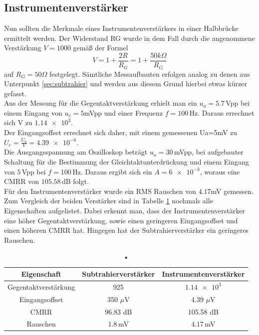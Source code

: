 \subsection{Instrumentenverstärker}
Nun sollten die Merkmale eines Instrumentenverstärkers in einer Halbbrücke ermittelt werden. Der Widerstand RG wurde in dem Fall durch die angenommene Verstärkung $V=1000$ gemäß der Formel
\begin{equation}
	V=1+\frac{2R}{R_G}=1+\frac{50k\Omega}{R_G} 
\end{equation} auf $R_G=50\Omega$ festgelegt.
Sämtliche Messaufbauten erfolgen analog zu denen aus Unterpunkt \ref{sec:subtrahier} und werden aus diesem Grund hierbei etwas kürzer gefasst. \\
Aus der Messung für die Gegentaktverstärkung erhielt man ein $u_a=5.7\,$Vpp bei einem Eingang von $u_e=5$mVpp und einer Frequenz $f=100\,$Hz. Daraus errechnet sich V zu $\num{1,14e+3}$.\\
Der Eingangsoffset errechnet sich daher, mit einem gemessenen Ua=5mV zu $U_e=\frac{U_a}{V}=\num{4.39e-6}$. \\
Die Ausgangsspannung am Oszilloskop beträgt $u_a=30\,$mVpp, bei aufgebauter Schaltung für die Bestimmung der Gleichtaktunterdrückung und einem Eingang von $5\,$Vpp bei $f=100\,$Hz. Daraus ergibt sich ein $A=\num{6e-3}$, woraus eine CMRR von $105.58\,$dB folgt. \\
Für den Instrumentenverstärker wurde ein RMS Rauschen von $4.17$mV gemessen. \\
Zum Vergleich der beiden Verstärker sind in Tabelle \ref{tb:eigenschaften} nochmals alle Eigenschaften aufgelistet. Dabei erkennt man, dass der Instrumentenverstärker eine höher Gegentaktverstärkung, sowie einen geringeren Eingangsoffset und einen höheren CMRR hat. Hingegen hat der Subtrahierverstärker ein geringeres Rauschen.
\begin{table}
	\begin{tabular}{|c|c|c|}
	\hline 
	Eigenschaft & Subtrahierverstärker & Instrumentenverstärker \\ 
	\hline 
	Gegentaktverstärkung & 925 & $\num{1.14e+3}$ \\ 
	\hline 
	Eingangsoffset & 350 $\mu$V & 4.39 $\mu$V \\ 
	\hline 
	CMRR & 96.83 dB & 105.58 dB \\ 
	\hline 
	Rauschen & $1.8\,$mV & $4.17\,$mV \\ 
	\hline 
	\end{tabular}
	\centering
	\caption{•}
	\label{tb:eigenschaften}
\end{table}

